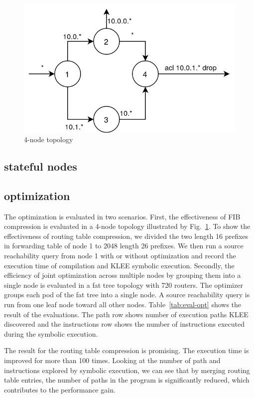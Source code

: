 \documentclass[letterpaper, 10 pt, conference]{ieeeconf}  %
\begin{document}
\begin{figure}[]
	\centering
	\includegraphics[width=\linewidth]{scenario-simple.png}
	\caption{4-node topology}
	\label{fig:scenario1}
\end{figure}

\subsection{stateful nodes}

\subsection{optimization}
The optimization is evaluated in two scenarios. First, the effectiveness of FIB compression is evaluated in a 4-node topology illustrated by Fig.~\ref{fig:scenario1}. To show the effectiveness of routing table compression, we divided the two length 16 prefixes in forwarding table of node 1 to 2048 length 26 prefixes. We then run a source reachability query from node 1 with or without optimization and record the execution time of compilation and KLEE symbolic execution. Secondly, the efficiency of joint optimization across multiple nodes by grouping them into a single node is evaluated in a fat tree topology with 720 routers. The optimizer groups each pod of the fat tree into a single node. A source reachability query is run from one leaf node toward all other nodes. Table~\ref{tab:eval-opt} shows the result of the evaluations. The path row shows number of execution paths KLEE discovered and the instructions row shows the number of instructions executed during the symbolic execution.

The result for the routing table compression is promising. The execution time is improved for more than 100 times. Looking at the number of path and instructions explored by symbolic execution, we can see that by merging routing table entries, the number of paths in the program is significantly reduced, which contributes to the performance gain.
\end{document}
